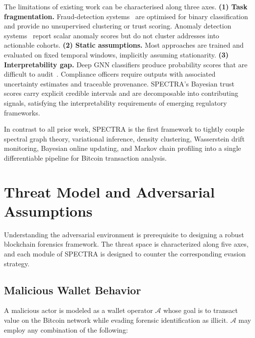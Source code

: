 \documentclass[journal]{IEEEtran}
\newcommand{\spectra}{\textsc{SPECTRA}}
\begin{document}
The limitations of existing work can be characterised along three axes.
\textbf{(1) Task fragmentation.}
Fraud-detection systems~\cite{Tan2023,Guang2025,LiuJ2025,Wu2025,ZhaoW2026} are
optimised for binary classification and provide no unsupervised clustering or
trust scoring.
Anomaly detection systems~\cite{Alshameri2024,Guan2024} report scalar anomaly
scores but do not cluster addresses into actionable cohorts.
\textbf{(2) Static assumptions.}
Most approaches are trained and evaluated on fixed temporal windows, implicitly
assuming stationarity.
\textbf{(3) Interpretability gap.}
Deep GNN classifiers produce probability scores that are difficult to
audit~\cite{Huang2025}.  Compliance officers require outputs with
associated uncertainty estimates and traceable provenance.  \spectra{}'s
Bayesian trust scores carry explicit credible intervals and are decomposable
into contributing signals, satisfying the interpretability requirements of
emerging regulatory frameworks.

In contrast to all prior work, \spectra{} is the first framework to tightly
couple spectral graph theory, variational inference, density clustering,
Wasserstein drift monitoring, Bayesian online updating, and Markov chain
profiling into a single differentiable pipeline for Bitcoin transaction
analysis.

\FloatBarrier
\section{Threat Model and Adversarial Assumptions}
\label{sec:threat}

Understanding the adversarial environment is prerequisite to designing a
robust blockchain forensics framework.  The threat space is characterized
along five axes, and each module of \spectra{} is designed to counter the
corresponding evasion strategy.

\subsection{Malicious Wallet Behavior}
\label{subsec:malicious_wallets}

A malicious actor is modeled as a wallet operator $\mathcal{A}$ whose goal is
to transact value on the Bitcoin network while evading forensic
identification as illicit.  $\mathcal{A}$ may employ any combination of the
following:
\end{document}
